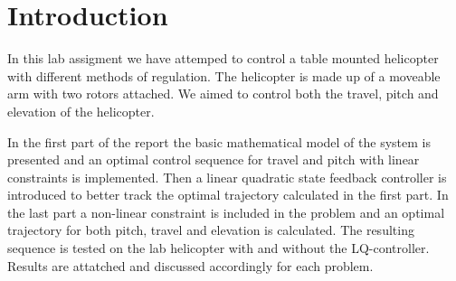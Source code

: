 \section{Introduction}

In this lab assigment we have attemped to control a table mounted helicopter with different methods of regulation. The helicopter is made up of a moveable arm with two rotors attached. We aimed to control both the travel, pitch and elevation of the helicopter.

In the first part of the report the basic mathematical model of the system is presented and an optimal control sequence for travel and pitch with linear constraints is implemented. Then a linear quadratic state feedback controller is introduced to better track the optimal trajectory calculated in the first part. In the last part a non-linear constraint is included in the problem and an optimal trajectory for both pitch, travel and elevation is calculated. The resulting sequence is tested on the lab helicopter with and without the LQ-controller. Results are attatched and discussed accordingly for each problem.
